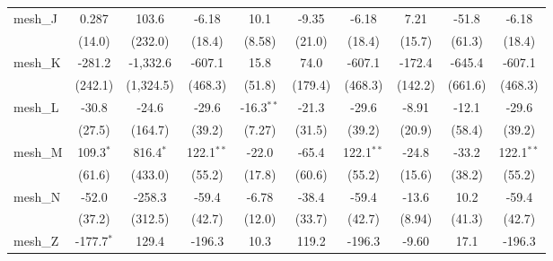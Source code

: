 \begin{tabular}{lccccccccc}
   mesh\_J                                                     & 0.287           & 103.6           & -6.18          & 10.1          & -9.35         & -6.18          & 7.21           & -51.8         & -6.18\\   
                                                               & (14.0)          & (232.0)         & (18.4)         & (8.58)        & (21.0)        & (18.4)         & (15.7)         & (61.3)        & (18.4)\\   
   mesh\_K                                                     & -281.2          & -1,332.6        & -607.1         & 15.8          & 74.0          & -607.1         & -172.4         & -645.4        & -607.1\\   
                                                               & (242.1)         & (1,324.5)       & (468.3)        & (51.8)        & (179.4)       & (468.3)        & (142.2)        & (661.6)       & (468.3)\\   
   mesh\_L                                                     & -30.8           & -24.6           & -29.6          & -16.3$^{**}$  & -21.3         & -29.6          & -8.91          & -12.1         & -29.6\\   
                                                               & (27.5)          & (164.7)         & (39.2)         & (7.27)        & (31.5)        & (39.2)         & (20.9)         & (58.4)        & (39.2)\\   
   mesh\_M                                                     & 109.3$^{*}$     & 816.4$^{*}$     & 122.1$^{**}$   & -22.0         & -65.4         & 122.1$^{**}$   & -24.8          & -33.2         & 122.1$^{**}$\\   
                                                               & (61.6)          & (433.0)         & (55.2)         & (17.8)        & (60.6)        & (55.2)         & (15.6)         & (38.2)        & (55.2)\\   
   mesh\_N                                                     & -52.0           & -258.3          & -59.4          & -6.78         & -38.4         & -59.4          & -13.6          & 10.2          & -59.4\\   
                                                               & (37.2)          & (312.5)         & (42.7)         & (12.0)        & (33.7)        & (42.7)         & (8.94)         & (41.3)        & (42.7)\\   
   mesh\_Z                                                     & -177.7$^{*}$    & 129.4           & -196.3         & 10.3          & 119.2         & -196.3         & -9.60          & 17.1          & -196.3\\   

\end{tabular}
